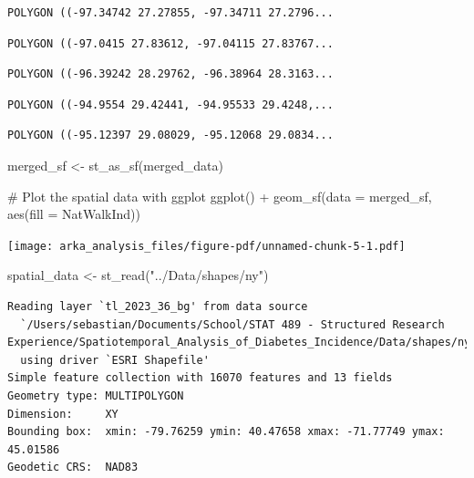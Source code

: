 \documentclass[
  letterpaper,
  DIV=11,
  numbers=noendperiod]{scrartcl}
\newenvironment{Shaded}{\begin{snugshade}}{\end{snugshade}}
\newcommand{\AttributeTok}[1]{\textcolor[rgb]{0.40,0.45,0.13}{#1}}
\newcommand{\CommentTok}[1]{\textcolor[rgb]{0.37,0.37,0.37}{#1}}
\newcommand{\FunctionTok}[1]{\textcolor[rgb]{0.28,0.35,0.67}{#1}}
\newcommand{\NormalTok}[1]{\textcolor[rgb]{0.00,0.23,0.31}{#1}}
\newcommand{\OtherTok}[1]{\textcolor[rgb]{0.00,0.23,0.31}{#1}}
\newcommand{\SpecialCharTok}[1]{\textcolor[rgb]{0.37,0.37,0.37}{#1}}
\newcommand{\StringTok}[1]{\textcolor[rgb]{0.13,0.47,0.30}{#1}}
\begin{document}
\begin{verbatim}
POLYGON ((-97.34742 27.27855, -97.34711 27.2796...
\end{verbatim}

\begin{verbatim}
POLYGON ((-97.0415 27.83612, -97.04115 27.83767...
\end{verbatim}

\begin{verbatim}
POLYGON ((-96.39242 28.29762, -96.38964 28.3163...
\end{verbatim}

\begin{verbatim}
POLYGON ((-94.9554 29.42441, -94.95533 29.4248,...
\end{verbatim}

\begin{verbatim}
POLYGON ((-95.12397 29.08029, -95.12068 29.0834...
\end{verbatim}

\begin{Shaded}
\begin{Highlighting}[]
\NormalTok{merged\_sf }\OtherTok{\textless{}{-}} \FunctionTok{st\_as\_sf}\NormalTok{(merged\_data)}

\CommentTok{\# Plot the spatial data with ggplot}
\FunctionTok{ggplot}\NormalTok{() }\SpecialCharTok{+}
  \FunctionTok{geom\_sf}\NormalTok{(}\AttributeTok{data =}\NormalTok{ merged\_sf, }\FunctionTok{aes}\NormalTok{(}\AttributeTok{fill =}\NormalTok{ NatWalkInd)) }
\end{Highlighting}
\end{Shaded}

\texttt{[image: arka\_analysis\_files/figure-pdf/unnamed-chunk-5-1.pdf]}

\begin{Shaded}
\begin{Highlighting}[]
\NormalTok{spatial\_data }\OtherTok{\textless{}{-}} \FunctionTok{st\_read}\NormalTok{(}\StringTok{"../Data/shapes/ny"}\NormalTok{)}
\end{Highlighting}
\end{Shaded}

\begin{verbatim}
Reading layer `tl_2023_36_bg' from data source 
  `/Users/sebastian/Documents/School/STAT 489 - Structured Research Experience/Spatiotemporal_Analysis_of_Diabetes_Incidence/Data/shapes/ny' 
  using driver `ESRI Shapefile'
Simple feature collection with 16070 features and 13 fields
Geometry type: MULTIPOLYGON
Dimension:     XY
Bounding box:  xmin: -79.76259 ymin: 40.47658 xmax: -71.77749 ymax: 45.01586
Geodetic CRS:  NAD83
\end{verbatim}
\end{document}
